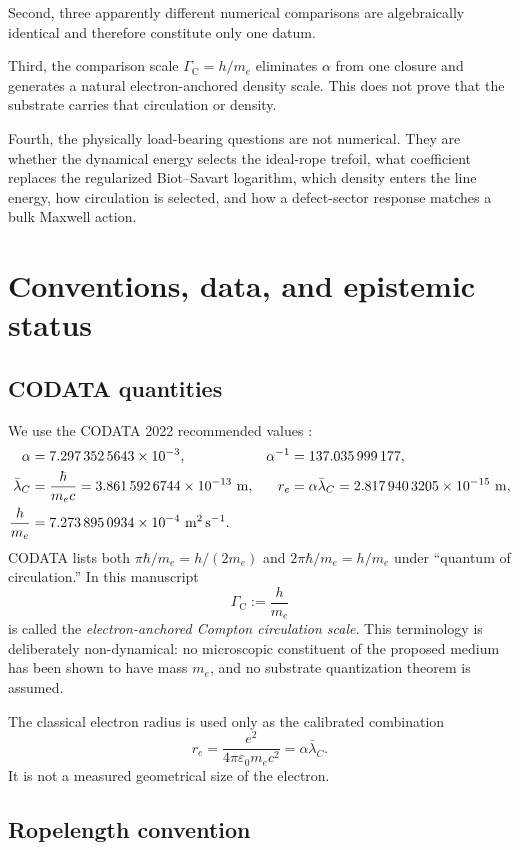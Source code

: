 \documentclass[aps,pre,preprint,notitlepage,nofootinbib,superscriptaddress]{revtex4-2}
\newcommand{\lC}{\bar\lambda_C}
\newcommand{\re}{r_e}
\newcommand{\GammaC}{\Gamma_{\mathrm C}}
\begin{document}
Second, three apparently different numerical comparisons are algebraically identical and therefore constitute only one datum.

Third, the comparison scale \(\GammaC=h/m_e\) eliminates \(\alpha\) from one closure and generates a natural electron-anchored density scale.  This does not prove that the substrate carries that circulation or density.

Fourth, the physically load-bearing questions are not numerical.  They are whether the dynamical energy selects the ideal-rope trefoil, what coefficient replaces the regularized Biot--Savart logarithm, which density enters the line energy, how circulation is selected, and how a defect-sector response matches a bulk Maxwell action.

\section{Conventions, data, and epistemic status}
\label{sec:conventions}

\subsection{CODATA quantities}

We use the CODATA 2022 recommended values \cite{CODATA2022}:
\begin{align}
  \alpha &= 7.297\,352\,5643\times10^{-3},
  &
  \alpha^{-1}&=137.035\,999\,177,
  \notag\\
  \lC &= \frac{\hbar}{m_ec}
  =3.861\,592\,6744\times10^{-13}\ \mathrm{m},
  &
  \re &= \alpha\lC
  =2.817\,940\,3205\times10^{-15}\ \mathrm{m},
  \notag\\
  \frac{h}{m_e}
  &=7.273\,895\,0934\times10^{-4}\ \mathrm{m^2\,s^{-1}}.
\end{align}
CODATA lists both \(\pi\hbar/m_e=h/(2m_e)\) and
\(2\pi\hbar/m_e=h/m_e\) under ``quantum of circulation.''  In this manuscript
\[
\GammaC:=\frac{h}{m_e}
\]
is called the \emph{electron-anchored Compton circulation scale}.  This terminology is deliberately non-dynamical: no microscopic constituent of the proposed medium has been shown to have mass \(m_e\), and no substrate quantization theorem is assumed.

The classical electron radius is used only as the calibrated combination
\[
\re=\frac{e^2}{4\pi\varepsilon_0m_ec^2}
=\alpha\lC.
\]
It is not a measured geometrical size of the electron.

\subsection{Ropelength convention}
\end{document}
